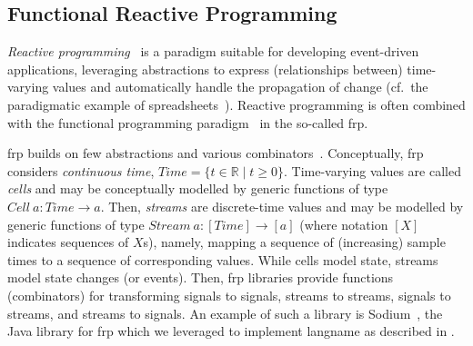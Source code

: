 \subsection{Functional Reactive Programming}
\label{acsos2023-frp:sec:background:frp}

\emph{Reactive programming}~\cite{DBLP:journals/csur/BainomugishaCCMM13} is a paradigm suitable for developing event-driven applications,
 leveraging abstractions to express (relationships between) time-varying values and 
 automatically handle the propagation of change
(cf.\ the paradigmatic example of spreadsheets~\cite{blackheath2016frp-sodium}).
%
%
Reactive programming is often combined with the functional programming paradigm~\cite{DBLP:journals/csur/BainomugishaCCMM13,blackheath2016frp-sodium}
in the so-called \ac{frp}.

\newcommand{\Time}{\ensuremath{\mathit{Time}}}
\newcommand{\Sg}{\ensuremath{\mathit{Cell}}}
\newcommand{\St}{\ensuremath{\mathit{Stream}}}

\Ac{frp} builds on few abstractions and various combinators~\cite{DBLP:conf/pldi/WanH00}.
%
Conceptually,
\ac{frp} considers \emph{continuous time}, $\Time = \{ t \in \mathbb{R} \mid t \geq 0 \}$.
%
Time-varying values are called \emph{cells}
 and may be conceptually modelled by generic functions of type $\Sg\:a: \Time \to a$.
%
Then, \emph{streams} are discrete-time values
 and may be modelled by generic functions of type
$\St\:a: [\Time] \to [a]$ (where notation $[X]$ indicates sequences of $X$s), namely, 
mapping a sequence of (increasing) sample times to a sequence of corresponding values.
%
While cells model state,
 streams model state changes (or events).
%
Then, \ac{frp} libraries %
 provide functions (combinators) for transforming signals to signals,
  streams to streams,
  signals to streams,
  and streams to signals.
%
An example of such a library %
 is Sodium~\cite{blackheath2016frp-sodium},
 the Java library for \ac{frp}
 which we leveraged to implement \ac{langname} as described in .
  

